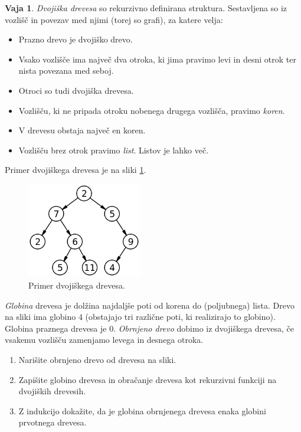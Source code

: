 \documentclass{article}
\theoremstyle{definition}
\newtheorem{vaja}{Vaja}
\begin{document}
\begin{vaja}
	\emph{Dvojiška drevesa} so rekurzivno definirana struktura. Sestavljena so iz vozlišč in povezav med njimi (torej so grafi), za katere velja:
	\begin{itemize}
		\item Prazno drevo je dvojiško drevo.
		\item Vsako vozlišče ima največ dva otroka, ki jima pravimo levi in desni otrok ter nista povezana med seboj.
		\item Otroci so tudi dvojiška drevesa.
		\item Vozlišču, ki ne pripada otroku nobenega drugega vozlišča, pravimo \emph{koren}.
		\item V drevesu obstaja največ en koren.
		\item Vozlišču brez otrok pravimo \emph{list}. Listov je lahko več.
	\end{itemize}
	Primer dvojiškega drevesa je na sliki \ref{fig:drevo}.
	\begin{figure}[!h]
		\centering
		\includegraphics[width = 5cm]{Binary_tree.png}
		\caption{Primer dvojiškega drevesa.}
		\label{fig:drevo}
	\end{figure}
	
	\emph{Globina} drevesa je dolžina najdaljše poti od korena do (poljubnega) lista. Drevo na sliki ima globino $4$ (obstajajo tri različne poti, ki realizirajo to globino). Globina praznega drevesa je 0.  
	\emph{Obrnjeno drevo} dobimo iz dvojiškega drevesa, če vsakemu vozlišču zamenjamo levega in desnega otroka. 
	\begin{enumerate}
		\item Narišite obrnjeno drevo od drevesa na sliki.
		\item Zapišite globino drevesa in obračanje drevesa kot rekurzivni funkciji na dvojiških drevesih.
		\item Z indukcijo dokažite, da je globina obrnjenega drevesa enaka globini prvotnega drevesa. 
	\end{enumerate}
\end{vaja}
\end{document}
